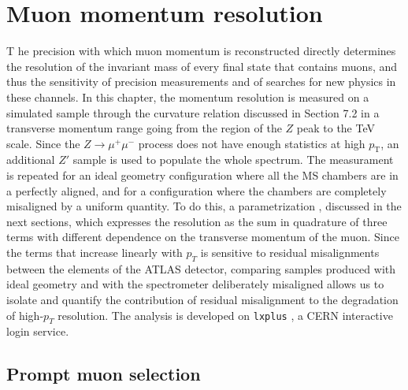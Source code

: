 \documentclass[11pt,a4paper,twoside,openright]{report}
\begin{document}
\chapter{Muon momentum resolution}

\lettrine[lines=3,loversize=0.1,lraise=0.05]{T}{} he precision with which muon momentum is reconstructed directly determines the resolution of the invariant mass of every final state that contains muons, and thus the sensitivity of precision measurements and of searches for new physics in these channels. In this chapter, the momentum resolution is measured on a simulated sample through the curvature relation discussed in Section 7.2 in a transverse momentum range going from the region of the \(Z\) peak to the TeV scale. Since the \(Z\to\mu^+\mu^-\) process does not have enough statistics at high \(p_{\mathrm{T}}\), an additional \(Z'\) sample is used to populate the whole spectrum. The measurament is repeated for an ideal geometry configuration where all the MS chambers are in a perfectly aligned, and for a configuration where the chambers are completely misaligned by a uniform quantity. To do this, a parametrization \cite{ATLAS-MUON-2016, ATLAS-MCP-2023}, discussed in the next sections, which expresses the resolution as the sum in quadrature of three terms with different dependence on the transverse momentum of the muon. Since the terms that increase linearly with \(p_T\) is sensitive to residual misalignments between the elements of the ATLAS detector, comparing samples produced with ideal geometry and with the spectrometer deliberately misaligned allows us to isolate and quantify the contribution of residual misalignment to the degradation of high-\(p_T\) resolution. The analysis is developed on \texttt{lxplus} \cite{lxplus}, a CERN interactive login service.



\section{Prompt muon selection}
\end{document}
